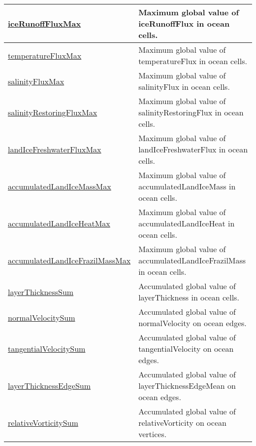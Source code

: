 {\begin{center}
\begin{longtable}{| p{2.0in} | p{4.0in} |}
    \hline
    \hyperref[subsec:var_sec_globalStatsAM_iceRunoffFluxMax]{iceRunoffFluxMax} & Maximum global value of iceRunoffFlux in ocean cells. \\
    \hline
    \hyperref[subsec:var_sec_globalStatsAM_temperatureFluxMax]{temperatureFluxMax} & Maximum global value of temperatureFlux in ocean cells. \\
    \hline
    \hyperref[subsec:var_sec_globalStatsAM_salinityFluxMax]{salinityFluxMax} & Maximum global value of salinityFlux in ocean cells. \\
    \hline
    \hyperref[subsec:var_sec_globalStatsAM_salinityRestoringFluxMax]{salinityRestoringFluxMax} & Maximum global value of salinityRestoringFlux in ocean cells. \\
    \hline
    \hyperref[subsec:var_sec_globalStatsAM_landIceFreshwaterFluxMax]{landIceFreshwaterFluxMax} & Maximum global value of landIceFreshwaterFlux in ocean cells. \\
    \hline
    \hyperref[subsec:var_sec_globalStatsAM_accumulatedLandIceMassMax]{accumulatedLandIceMassMax} & Maximum global value of accumulatedLandIceMass in ocean cells. \\
    \hline
    \hyperref[subsec:var_sec_globalStatsAM_accumulatedLandIceHeatMax]{accumulatedLandIceHeatMax} & Maximum global value of accumulatedLandIceHeat in ocean cells. \\
    \hline
    \hyperref[subsec:var_sec_globalStatsAM_accumulatedLandIceFrazilMassMax]{accumulatedLandIceFrazilMass\-Max} & Maximum global value of accumulatedLandIceFrazilMass in ocean cells. \\
    \hline
    \hyperref[subsec:var_sec_globalStatsAM_layerThicknessSum]{layerThicknessSum} & Accumulated global value of layerThickness in ocean cells. \\
    \hline
    \hyperref[subsec:var_sec_globalStatsAM_normalVelocitySum]{normalVelocitySum} & Accumulated global value of normalVelocity on ocean edges. \\
    \hline
    \hyperref[subsec:var_sec_globalStatsAM_tangentialVelocitySum]{tangentialVelocitySum} & Accumulated global value of tangentialVelocity on ocean edges. \\
    \hline
    \hyperref[subsec:var_sec_globalStatsAM_layerThicknessEdgeSum]{layerThicknessEdgeSum} & Accumulated global value of layerThicknessEdgeMean on ocean edges. \\
    \hline
    \hyperref[subsec:var_sec_globalStatsAM_relativeVorticitySum]{relativeVorticitySum} & Accumulated global value of relativeVorticity on ocean vertices. \\

\end{longtable}
\end{center}}
